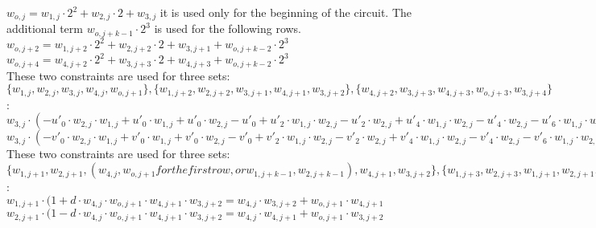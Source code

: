 \begin{center}
$w_{o, j } = w_{1,j} \cdot 2^2 + w_{2,j} \cdot 2 + w_{3, j}$ it is used only for the beginning of the circuit. The additional term $w_{o, j+k - 1} \cdot 2^3$ is used for the following rows. \\
$w_{o, j + 2} = w_{1,j + 2} \cdot 2^2 + w_{2,j + 2} \cdot 2 + w_{3, j + 1} + w_{o, j+k - 2} \cdot 2^3$ \\
$w_{o, j + 4} = w_{4,j + 2} \cdot 2^2 + w_{3,j + 3} \cdot 2 + w_{4, j + 3} + w_{o, j+k - 2} \cdot 2^3$ \\


These two constraints are used for three sets: $\{ w_{1,j}, w_{2,j}, w_{3,j}, w_{4,j}, w_{o, j+1} \}, \{ w_{1, j+2}, w_{2, j +2}, w_{3, j+1}, w_{4, j+1}, w_{3, j+2}\}, \{w_{4,j+2}, w_{3,j+3}, w_{4, j+3},w_{o, j+3}, w_{3, j+4} \}$: \\
$w_{3, j} \cdot (-u'_0 \cdot w_{2, j} \cdot w_{1, j} + u'_0 \cdot w_{1, j} + u'_0 \cdot w_{2, j} - u'_0 + u'_2 \cdot w_{1, j}\cdot w_{2, j} - u'_2\cdot w_{2, j} + u'_4 \cdot w_{1, j}\cdot w_{2, j} - u'_4\cdot w_{2, j} -u'_6 \cdot w_{1, j} \cdot w_{2, j} + u'_1 \cdot w_{2, j} \cdot w_{1, j} - u'_1 \cdot w_{1, j} - u'_1 \cdot w_{2, j} + u'_1  - u'_3 \cdot w_{1, j}\cdot w_{2, j} + u'_3\cdot w_{2, j} - u'_5 \cdot w_{1, j}\cdot w_{2, j} + u'_5\cdot w_{2, j} + u'_7 \cdot w_{1, j} \cdot w_{2, j}) = w_{4,j} -u'_0 \cdot w_{2, j} \cdot w_{1, j} + u'_0 \cdot w_{1, j} + u'_0 \cdot w_{2, j} - u'_0 + u'_2 \cdot w_{1, j}\cdot w_{2, j} - u'_2\cdot w_{2, j} + u'_4 \cdot w_{1, j}\cdot w_{2, j} - u'_4\cdot w_{2, j} -u'_6 \cdot w_{1, j} \cdot w_{2, j} $ \\

$w_{3, j} \cdot (-v'_0 \cdot w_{2, j} \cdot w_{1, j} + v'_0 \cdot w_{1, j} + v'_0 \cdot w_{2, j} - v'_0 + v'_2 \cdot w_{1, j}\cdot w_{2, j} -v'_2\cdot w_{2, j} + v'_4 \cdot w_{1, j}\cdot w_{2, j} - v'_4\cdot w_{2, j} -v'_6 \cdot w_{1, j} \cdot w_{2, j} + v'_1 \cdot w_{2, j} \cdot w_{1, j} - v'_1 \cdot w_{1, j} - v'_1 \cdot w_{2, j} + v'_1  - v'_3 \cdot w_{1, j}\cdot w_{2, j} + v'_3\cdot w_{2, j} - v'_5 \cdot w_{1, j}\cdot w_{2, j} + v'_5\cdot w_{2, j} + v'_7 \cdot w_{1, j} \cdot w_{2, j}) = w_{o,j+1} - v'_0 \cdot w_{2, j} \cdot w_{1, j} + v'_0 \cdot w_{1, j} + v'_0 \cdot w_{2, j} - v'_0 + v'_2 \cdot w_{1, j}\cdot w_{2, j} - v'_2\cdot w_{2, j} + v'_4 \cdot w_{1, j}\cdot w_{2, j} - v'_4\cdot w_{2, j} - v'_6 \cdot w_{1, j} \cdot w_{2, j} $ \\

These two constraints are used for three sets: $\{ w_{1,j+1}, w_{2,j+1}, ( w_{4,j}, w_{o,j+1} for the first row, or w_{1, j + k - 1}, w_{2, j + k - 1}), w_{4, j+1}, w_{3,j+2} \}, \{ w_{1, j+3}, w_{2, j +3}, w_{1, j+1}, w_{2, j+1}, w_{o, j+3}, w_{3, j+4}\}, \{w_{1,j+2}, w_{2,j+4}, w_{1, j+3},w_{2, j+3}, w_{4, j+5}, w_{o,j+6} \}$: \\
$w_{1, j+1} \cdot (1 + d \cdot w_{4,j} \cdot w_{o,j+1} \cdot w_{4,j+1} \cdot w_{3, j+2} = w_{4,j} \cdot w_{3, j+2} + w_{o,j+1} \cdot w_{4,j+1}$
$w_{2, j+1} \cdot (1 - d \cdot w_{4,j} \cdot w_{o,j+1} \cdot w_{4,j+1} \cdot w_{3, j+2} = w_{4,j} \cdot w_{4, j+1} + w_{o,j+1} \cdot w_{3,j+2}$

\end{center}

